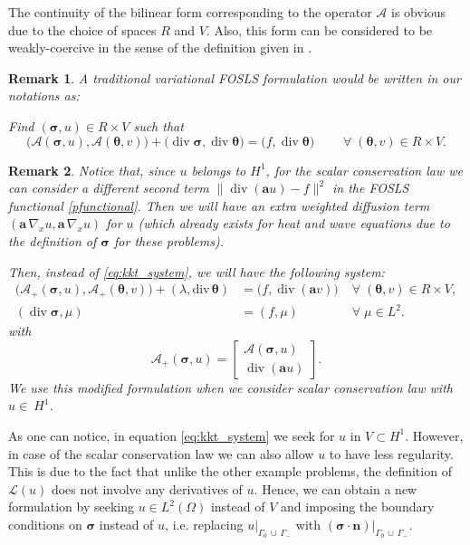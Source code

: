 \documentclass[a4paper,12pt]{amsart}
\numberwithin{equation}{section}
\newtheorem{remark}{Remark}[section]
\renewcommand{\div}{\operatorname{div}}
\def\bu{{\mathbf a}} %
\def\bn{{\mathbf n}}
\newcommand{\A}{{\mathcal A}}
\def\btheta{{\boldsymbol \theta}}
\def\bsigma{{\boldsymbol \sigma}}
\newcommand{\om}{\Omega}
\begin{document}
The continuity of the bilinear form corresponding to the operator $\A$ is obvious due to the choice of spaces $R$ and $V$. Also, this form can be considered to be weakly-coercive in the sense of the definition given in \cite{AdlerVassilevski}.

\begin{remark}
A traditional variational FOSLS formulation would be written in our notations as:

Find $(\bsigma, u) \in R\times V$ such that 
\[
\big(\A(\bsigma, u ), \A(\btheta, v) \big) + \big( \div \bsigma, \div \btheta \big) = \big(f, \div \btheta\big) \qquad \;\forall\; (\btheta, v) \in R\times V.
\]
\end{remark}

\begin{remark}\label{rmk:complicate}
Notice that, since $u$ belongs to $H^1$, for the scalar conservation law we can consider a different second term $\| \div (\bu u) - f \|^2$ in the FOSLS functional \eqref{pfunctional}. Then we will have an extra weighted diffusion term $(\bu  \, \nabla_x u, \bu \, \nabla_x u)$ for $u$ (which already exists for heat and wave equations due to the definition of $\bsigma$ for these problems).

Then, instead of \eqref{eq:kkt_system}, we will have the following
 system:
\begin{equation}
\begin{array}{lll}
\big(\A_+(\bsigma, u), \A_+(\btheta, v) \big) + (\lambda, \mathrm{div}\,  \btheta) & = \big( f, \div (\bu v) \big)  & \;\forall\; (\btheta, v) \in R\times V,     \\
( \div  \bsigma,\mu )  &= (f, \mu) &  \;\forall\;  \mu\in L^2.
\end{array}
\label{eq:kkt_system_compl}
\end{equation} 
with
\begin{equation}
\A_+(\bsigma, u) = \begin{bmatrix} \A(\bsigma, u) \\ \div (\bu u) \end{bmatrix}.
\label{eq:Adefine}
\end{equation}
We use this modified formulation when we consider scalar conservation law with $u\in~H^1$.
\end{remark}

As one can notice, in equation \eqref{eq:kkt_system}  we seek for $u$ in $V \subset H^1$. However, in case of the scalar conservation law we can also allow $u$ to  have less regularity. This is due to the fact that unlike the other example problems,  the definition of $\mathcal{L}(u)$ does not involve any derivatives of $u$.  
%
Hence, we can obtain a new formulation by seeking $u  \in L^2(\om)$ instead of $V$ and imposing the boundary conditions on $\bsigma$ instead of $u$, i.e. replacing $u|_{\Gamma_0\,\cup\,\Gamma_-}$ with $(\bsigma\cdot\bn)|_{\Gamma_0\,\cup\,\Gamma_-}$. 
\end{document}
